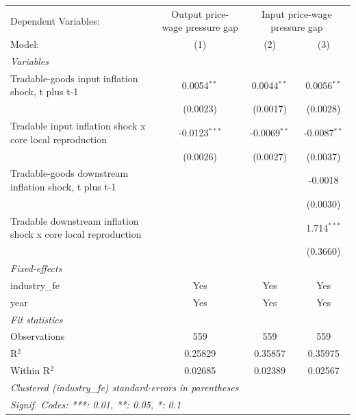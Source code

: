 \begingroup
\centering
\begin{tabular}{lccc}
   \tabularnewline \midrule \midrule
   Dependent Variables: & Output price-wage pressure gap & \multicolumn{2}{c}{Input price-wage pressure gap}\\
   Model:                                                        & (1)             & (2)            & (3)\\  
   \midrule
   \emph{Variables}\\
   Tradable-goods input inflation shock, t plus t-1              & 0.0054$^{**}$   & 0.0044$^{**}$  & 0.0056$^{**}$\\   
                                                                 & (0.0023)        & (0.0017)       & (0.0028)\\   
   Tradable input inflation shock x core local reproduction      & -0.0123$^{***}$ & -0.0069$^{**}$ & -0.0087$^{**}$\\   
                                                                 & (0.0026)        & (0.0027)       & (0.0037)\\   
   Tradable-goods downstream inflation shock, t plus t-1         &                 &                & -0.0018\\   
                                                                 &                 &                & (0.0030)\\   
   Tradable downstream inflation shock x core local reproduction &                 &                & 1.714$^{***}$\\   
                                                                 &                 &                & (0.3660)\\   
   \midrule
   \emph{Fixed-effects}\\
   industry\_fe                                                  & Yes             & Yes            & Yes\\  
   year                                                          & Yes             & Yes            & Yes\\  
   \midrule
   \emph{Fit statistics}\\
   Observations                                                  & 559             & 559            & 559\\  
   R$^2$                                                         & 0.25829         & 0.35857        & 0.35975\\  
   Within R$^2$                                                  & 0.02685         & 0.02389        & 0.02567\\  
   \midrule \midrule
   \multicolumn{4}{l}{\emph{Clustered (industry\_fe) standard-errors in parentheses}}\\
   \multicolumn{4}{l}{\emph{Signif. Codes: ***: 0.01, **: 0.05, *: 0.1}}\\
\end{tabular}
\par\endgroup
